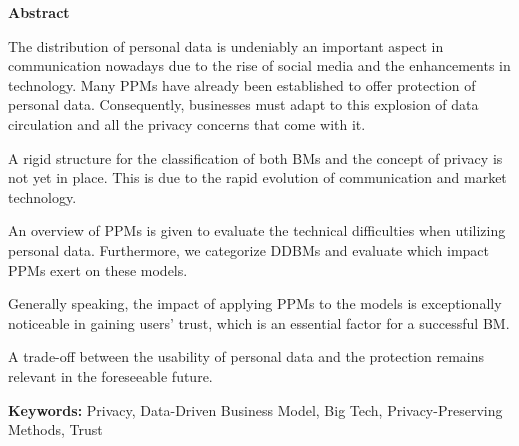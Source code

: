 {\small\bfseries\noindent Abstract} 
\newline
\newline

The distribution of personal data is undeniably an important aspect in communication nowadays due to the rise of social media and the enhancements in technology. 
Many \glspl{PPM} have already been established to offer protection of personal data. 
Consequently, businesses must adapt to this explosion of data circulation and all the privacy concerns that come with it.

A rigid structure for the classification of both \glspl{BM} and the concept of privacy is not yet in place. This is due to the rapid evolution of communication and market technology. 

An overview of \glspl{PPM} is given to evaluate the technical difficulties when utilizing personal data.
Furthermore, we categorize \glspl{DDBM} and evaluate which impact \gls{PPM}s exert on these models.

Generally speaking, the impact of applying \gls{PPM}s to the models is exceptionally noticeable in gaining users' trust, which is an essential factor for a successful \gls{BM}.

A trade-off between the usability of personal data and the protection remains relevant in the foreseeable future.

\textbf{Keywords:} Privacy, Data-Driven Business Model, Big Tech, Privacy-Preserving Methods, Trust

